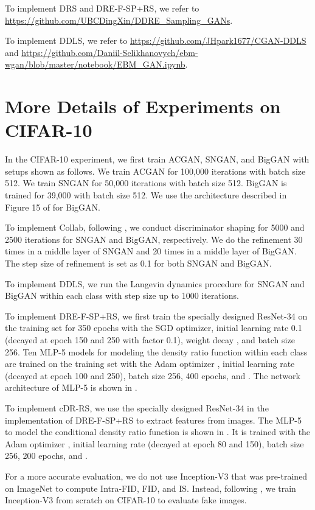 \documentclass[final,12pt, 3p,times]{elsarticle}
\begin{document}
To implement DRS and DRE-F-SP+RS, we refer to \url{https://github.com/UBCDingXin/DDRE_Sampling_GANs}. 

To implement DDLS, we refer to \url{https://github.com/JHpark1677/CGAN-DDLS} and \url{https://github.com/Daniil-Selikhanovych/ebm-wgan/blob/master/notebook/EBM_GAN.ipynb}. 

\section{More Details of Experiments on CIFAR-10}\label{supp:details_of_cifar10}

In the CIFAR-10 experiment, we first train ACGAN, SNGAN, and BigGAN with setups shown as follows. We train ACGAN for 100,000 iterations with batch size 512. We train SNGAN for 50,000 iterations with batch size 512. BigGAN is trained for 39,000 with batch size 512. We use the architecture described in Figure 15 of \cite{brock2018large} for BigGAN.

To implement Collab, following \cite{liu2020collaborative}, we conduct discriminator shaping for 5000 and 2500 iterations for SNGAN and BigGAN, respectively. We do the refinement 30 times in a middle layer of SNGAN and 20 times in a middle layer of BigGAN. The step size of refinement is set as 0.1 for both SNGAN and BigGAN. 

To implement DDLS, we run the Langevin dynamics procedure for SNGAN and BigGAN within each class with step size  up to 1000 iterations.

To implement DRE-F-SP+RS, we first train the specially designed ResNet-34 on the training set for 350 epochs with the SGD optimizer, initial learning rate 0.1 (decayed at epoch 150 and 250 with factor 0.1), weight decay , and batch size 256. Ten MLP-5 models for modeling the density ratio function within each class are trained on the training set with the Adam optimizer \cite{kingma2014adam}, initial learning rate  (decayed at epoch 100 and 250), batch size 256, 400 epochs, and . The network architecture of MLP-5 is shown in . 

To implement cDR-RS, we use the specially designed ResNet-34 in the implementation of DRE-F-SP+RS to extract features from images. The MLP-5 to model the conditional density ratio function is shown in . It is trained with the Adam optimizer \cite{kingma2014adam}, initial learning rate  (decayed at epoch 80 and 150), batch size 256, 200 epochs, and .

For a more accurate evaluation, we do not use Inception-V3 \cite{szegedy2016rethinking} that was pre-trained on ImageNet \cite{imagenet_cvpr09} to compute Intra-FID, FID, and IS. Instead, following \cite{ding2020subsampling}, we train Inception-V3 from scratch on CIFAR-10 to evaluate fake images. 
\end{document}
